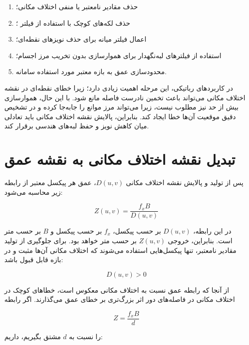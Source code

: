 \begin{enumerate}
	\item حذف مقادیر نامعتبر یا منفی اختلاف مکانی؛
	\item حذف لکه‌های کوچک با استفاده از فیلتر ؛
	\item اعمال فیلتر میانه برای حذف نویزهای نقطه‌ای؛
	\item استفاده از فیلترهای لبه‌نگهدار برای هموارسازی بدون تخریب مرز اجسام؛
	\item محدودسازی عمق به بازه معتبر مورد استفاده سامانه.
\end{enumerate}

در کاربردهای رباتیکی، این مرحله اهمیت زیادی دارد؛ زیرا خطای نقطه‌ای در نقشه اختلاف مکانی می‌تواند باعث تخمین نادرست فاصله مانع شود. با این حال، هموارسازی بیش از حد نیز مطلوب نیست، زیرا می‌تواند مرز موانع را جابه‌جا کرده و در تشخیص دقیق موقعیت آن‌ها خطا ایجاد کند. بنابراین، پالایش نقشه اختلاف مکانی باید تعادلی میان کاهش نویز و حفظ لبه‌های هندسی برقرار کند.

\section{تبدیل نقشه اختلاف مکانی به نقشه عمق}

پس از تولید و پالایش نقشه اختلاف مکانی \(D(u,v)\)، عمق هر پیکسل معتبر از رابطه زیر محاسبه می‌شود:

\begin{equation}
	Z(u,v)
	=
	\frac{f_x B}{D(u,v)}
	\label{eq:depth_map_from_disparity}
\end{equation}

در این رابطه، \(D(u,v)\) بر حسب پیکسل، \(f_x\) بر حسب پیکسل و \(B\) بر حسب متر است. بنابراین، خروجی \(Z(u,v)\) بر حسب متر خواهد بود. برای جلوگیری از تولید مقادیر نامعتبر، تنها پیکسل‌هایی استفاده می‌شوند که اختلاف مکانی آن‌ها مثبت و در بازه قابل قبول باشد:

\begin{equation}
	D(u,v) > 0
\end{equation}

از آنجا که رابطه عمق نسبت به اختلاف مکانی معکوس است، خطاهای کوچک در اختلاف مکانی در فاصله‌های دور اثر بزرگ‌تری بر خطای عمق می‌گذارند. اگر رابطه

\begin{equation}
	Z =
	\frac{f_x B}{d}
\end{equation}

را نسبت به \(d\) مشتق بگیریم، داریم:

